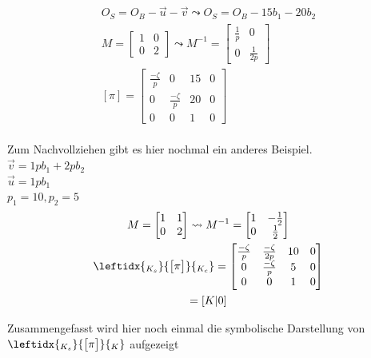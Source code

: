 		\begin{gather}
		O_S = O_B - \vec{u} - \vec{v} \leadsto O_S = O_B -15 b_1 - 20 b_2\\	
		M= 
		\begin{bmatrix}
		1&0\\
		0&2
		\end{bmatrix}
		\leadsto
		M^{-1}=\begin{bmatrix}
		\frac{1}{p}&0\\
		0&\frac{1}{2p}
		\end{bmatrix}\\
		[\pi] =
		\begin{bmatrix}
		\frac{-\zeta}{p}&0&15&0\\
		0&\frac{-\zeta}{p}&20&0\\
		0&0&1&0
		\end{bmatrix}
		\end{gather}\\
		
	  Zum Nachvollziehen gibt es hier nochmal ein anderes Beispiel.\\
		
		$\vec{v} = 1pb_1+2pb_2$\\
		$\vec{u} = 1pb_1$\\
		$ p_1 = 10, p_2 = 5$\\
		
		\begin{gather}
		M=\begin{bmatrix}
		1&1\\
		0&2
		\end{bmatrix} \leadsto 
		M^{-1} =
		\begin{bmatrix}
		1&-\frac{1}{2}\\
		0&\frac{1}{2}
		\end{bmatrix} \\
		\leftidx{_{K_{s}}}{\begin{bmatrix}
			\pi
			\end{bmatrix}}{_{K_{c}}}
		= 
		\begin{bmatrix}
		\frac{-\zeta}{p}&\frac{-\zeta}{2p}&10&0\\
		0&\frac{-\zeta}{p}&5&0\\
		0&0&1&0
		\end{bmatrix}\\
		= [K|0]
		\end{gather}
		
		Zusammengefasst wird hier noch einmal die symbolische Darstellung von $	\leftidx{_{K_{s}}}{\begin{bmatrix}
			\pi
			\end{bmatrix}}{_{K_{}}}$ aufgezeigt
		
